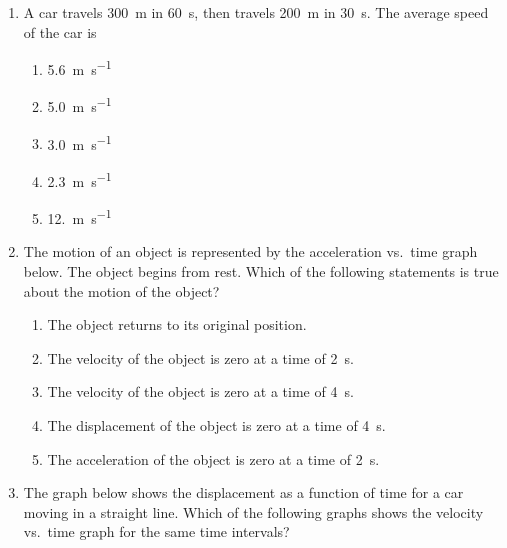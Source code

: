\documentclass{../../../oss-apphys}
\begin{document}
\begin{multicols}{2}
\begin{enumerate}[resume,leftmargin=18pt]
  \item A car travels \SI{300}{\metre} in \SI{60}{\second}, then travels
    \SI{200}{\metre} in \SI{30}{\second}. The average speed of the car is
    \begin{enumerate}[noitemsep,topsep=0pt,leftmargin=18pt,label=(\Alph*)]
    \item\SI{5.6}{\metre\per\second}
    \item\SI{5.0}{\metre\per\second}
    \item\SI{3.0}{\metre\per\second}
    \item\SI{2.3}{\metre\per\second}
    \item\SI{12.}{\metre\per\second}
    \end{enumerate}
    \columnbreak
    
  \item The motion of an object is represented by the acceleration vs.\ time
    graph below. The object begins from rest. Which of the following statements
    is true about the motion of the object?
    \begin{center}
    \end{center}
    \begin{enumerate}[noitemsep,topsep=0pt,leftmargin=18pt,label=(\Alph*)]
    \item The object returns to its original position.
    \item The velocity of the object is zero at a time of \SI{2}{\second}.
    \item The velocity of the object is zero at a time of \SI{4}{\second}.
    \item The displacement of the object is zero at a time of \SI{4}{\second}.
    \item The acceleration of the object is zero at a time of \SI{2}{\second}.
    \end{enumerate}
    \columnbreak
    
  \item The graph below shows the displacement as a function of time for a
    car moving in a straight line. Which of the following graphs shows the
    velocity vs.\ time graph for the same time intervals?
    \begin{center}
    \end{center}
    

\end{enumerate}
\end{multicols}
\end{document}

